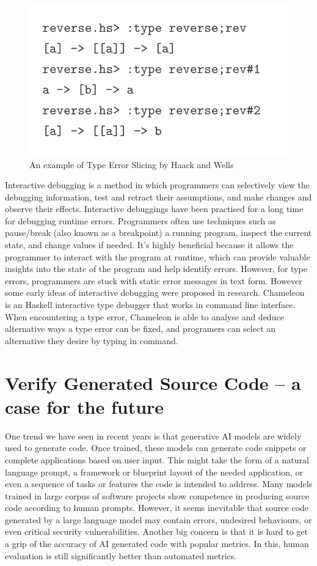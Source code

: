 \begin{figure}[hbt]
    \includegraphics[width=0.6\linewidth]{ChameleonInteractive}
    \caption{An example of Type Error Slicing by Haack and Wells
    }
\end{figure}
Interactive debugging is a method in which programmers can selectively view the debugging information, test and retract their assumptions, and  make changes and observe their effects. Interactive debuggings have been practised for a long time for debugging runtime errors. Programmers often use techniques such as pause/break (also known as a breakpoint) a running program, inspect the current state, and change values if needed. It's highly beneficial because it allows the programmer to interact with the program at runtime, which can provide valuable insights into the state of the program and help identify errors. However, for type errors, programmers are stuck with static error messages in text form. However some early ideas of interactive debugging were proposed in research. Chameleon is an Haskell interactive type debugger that works in command line interface. When encountering a type error, Chameleon is able to analyse and deduce alternative ways a type error can be fixed, and programers can select an alternative they desire by typing in command.


\section{Verify Generated Source Code -- a case for the future}

One trend we have seen in recent years is that generative AI models are widely used to generate code. Once trained, these models can generate code snippets or complete applications based on user input. This might take the form of a natural language prompt, a framework or blueprint layout of the needed application, or even a sequence of tasks or features the code is intended to address. Many models trained in large corpus of software projects show competence in producing source code according to human prompts. However, it seems inevitable that source code generated by a large language model may contain errors, undesired behaviours, or even critical security vulnerabilities. Another big concern is that it is hard to get a grip of the accuracy of AI generated code with popular metrics. In this, human evaluation is still significantly better than automated metrics.


